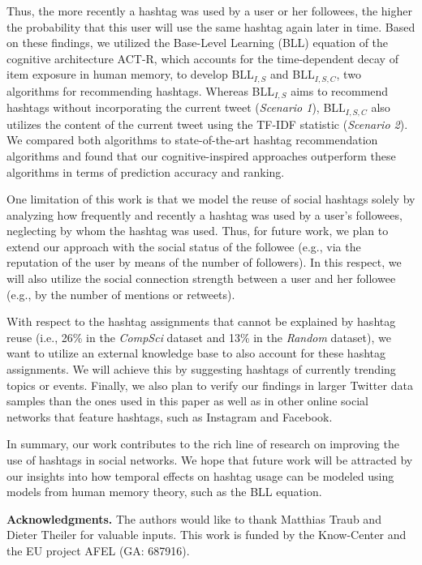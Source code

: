 \documentclass{sig-alternate-05-2015}
\newcommand{\para}[1]{\vspace{2mm}\noindent\textbf{#1}}
\begin{document}
Thus, the more recently a hashtag was used by a user or her followees, the higher the probability that this user will use the same hashtag again later in time. Based on these findings, we utilized the Base-Level Learning (BLL) equation of the cognitive architecture ACT-R, which accounts for the time-dependent decay of item exposure in human memory, to develop BLL$_{I,S}${} and BLL$_{I,S,C}${}, two algorithms for recommending hashtags. Whereas BLL$_{I,S}${} aims to recommend hashtags without incorporating the current tweet (\textit{Scenario 1}{}), BLL$_{I,S,C}${} also utilizes the content of the current tweet using the TF-IDF statistic (\textit{Scenario 2}{}). We compared both algorithms to state-of-the-art hashtag recommendation algorithms and found that our cognitive-inspired approaches outperform these algorithms in terms of prediction accuracy and ranking.

One limitation of this work is that we model the reuse of social hashtags solely by analyzing how frequently and recently a hashtag was used by a user's followees, neglecting by whom the hashtag was used. Thus, for future work, we plan to extend our approach with the social status of the followee (e.g., via the reputation of the user by means of the number of followers). In this respect, we will also utilize the social connection strength between a user and her followee (e.g., by the number of mentions or retweets).

With respect to the hashtag assignments that cannot be explained by hashtag reuse (i.e., 26\% in the \textit{CompSci}{} dataset and 13\% in the \textit{Random}{} dataset), we want to utilize an external knowledge base to also account for these hashtag assignments. We will achieve this by suggesting hashtags of currently trending topics or events. Finally, we also plan to verify our findings in larger Twitter data samples than the ones used in this paper as well as in other online social networks that feature hashtags, such as Instagram and Facebook.
%

In summary, our work contributes to the rich line of research on improving the use of hashtags in social networks. We hope that future work will be attracted by our insights into how temporal effects on hashtag usage can be modeled using models from human memory theory, such as the BLL equation.

\para{Acknowledgments.} The authors would like to thank Matthias Traub and Dieter Theiler for valuable inputs. This work is funded by the Know-Center and the EU project AFEL (GA: 687916).
\end{document}
